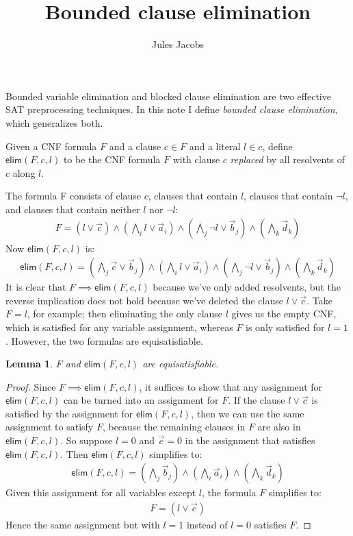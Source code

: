\documentclass[a4paper, 11pt]{article}
\title{Bounded clause elimination}
\author{Jules Jacobs}
\newtheorem{lemma}[theorem]{Lemma}
\theoremstyle{definition}
\begin{document}
\maketitle

Bounded variable elimination and blocked clause elimination are two effective SAT preprocessing techniques. In this note I define \emph{bounded clause elimination}, which generalizes both.

\newcommand{\elim}{\mathsf{elim}}

Given a CNF formula $F$ and a clause $c \in F$ and a literal $l \in c$, define $\elim(F,c,l)$ to be the CNF formula $F$ with clause $c$ \emph{replaced} by all resolvents of $c$ along $l$.

The formula F consists of clause $c$, clauses that contain $l$, clauses that contain $\neg l$, and clauses that contain neither $l$ nor $\neg l$:
\begin{align*}
  F = (l \vee \vec{c}) \wedge (\bigwedge_i l \vee \vec{a}_i) \wedge (\bigwedge_j \neg l \vee \vec{b}_j) \wedge (\bigwedge_k \vec{d}_k)
\end{align*}
Now $\elim(F,c,l)$ is:
\begin{align*}
  \elim(F,c,l) = (\bigwedge_j \vec{c} \vee \vec{b}_j) \wedge (\bigwedge_i l \vee \vec{a}_i) \wedge (\bigwedge_j \neg l \vee \vec{b}_j) \wedge (\bigwedge_k \vec{d}_k)
\end{align*}
It is clear that $F \implies \elim(F,c,l)$ because we've only added resolvents, but the reverse implication does not hold because we've deleted the clause $l \vee \vec{c}$. Take $F = l$, for example; then eliminating the only clause $l$ gives us the empty CNF, which is satisfied for any variable assignment, whereas $F$ is only satisfied for $l = 1$. However, the two formulas are equisatisfiable.

\begin{lemma}
  $F$ and $\elim(F,c,l)$ are equisatisfiable.
\end{lemma}
\begin{proof}
  Since $F \implies \elim(F,c,l)$, it suffices to show that any assignment for $\elim(F,c,l)$ can be turned into an assignment for $F$. If the clause $l \vee \vec{c}$ is satisfied by the assignment for $\elim(F,c,l)$, then we can use the same assignment to satisfy $F$, because the remaining clauses in $F$ are also in $\elim(F,c,l)$. So suppose $l = 0$ and $\vec{c} = 0$ in the assignment that satisfies $\elim(F,c,l)$. Then $\elim(F,c,l)$ simplifies to:
  \begin{align*}
    \elim(F,c,l) = (\bigwedge_j \vec{b}_j) \wedge (\bigwedge_i \vec{a}_i) \wedge (\bigwedge_k \vec{d}_k)
  \end{align*}
  Given this assignment for all variables except $l$, the formula $F$ simplifies to:
  \begin{align*}
    F = (l \vee \vec{c})
  \end{align*}
  Hence the same assignment but with $l = 1$ instead of $l = 0$ satisfies $F$.
\end{proof}
\end{document}
